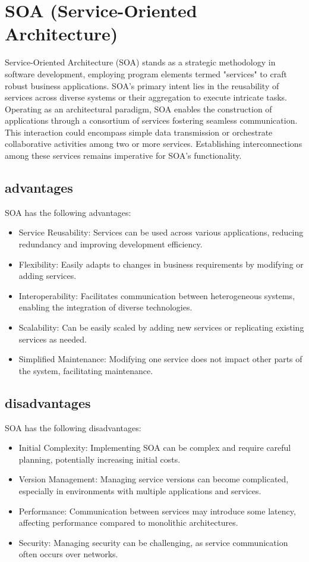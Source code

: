 \documentclass[12pt,a4paper, twosite]{article}
\begin{document}
\newpage

\section{SOA (Service-Oriented Architecture)}
\label{sec:org40573d1}

Service-Oriented Architecture (SOA) stands as a 
strategic methodology in software development, 
employing program elements termed "services" to 
craft robust business applications. SOA's primary intent 
lies in the reusability of services across diverse systems 
or their aggregation to execute intricate tasks. Operating 
as an architectural paradigm, SOA enables the construction 
of applications through a consortium of services fostering 
seamless communication. This interaction could encompass simple 
data transmission or orchestrate collaborative activities among 
two or more services. Establishing interconnections among these 
services remains imperative for SOA's functionality.

\subsection{advantages}
\label{sec:orgb8b6b9e}
SOA has the following advantages:
\begin{itemize}
\item Service Reusability: Services can be used across various applications, reducing redundancy and improving development efficiency.
\item Flexibility: Easily adapts to changes in business requirements by modifying or adding services.
\item Interoperability: Facilitates communication between heterogeneous systems, enabling the integration of diverse technologies.
\item Scalability: Can be easily scaled by adding new services or replicating existing services as needed.
\item Simplified Maintenance: Modifying one service does not impact other parts of the system, facilitating maintenance.
\end{itemize}


\subsection{disadvantages}
\label{sec:orgb8b6b9a}
SOA has the following disadvantages:
\begin{itemize}

\item Initial Complexity: Implementing SOA can be complex and require careful planning, potentially increasing initial costs.
\item Version Management: Managing service versions can become complicated, especially in environments with multiple applications and services.
\item Performance: Communication between services may introduce some latency, affecting performance compared to monolithic architectures.
\item Security: Managing security can be challenging, as service communication often occurs over networks.
\end{itemize}
\end{document}

